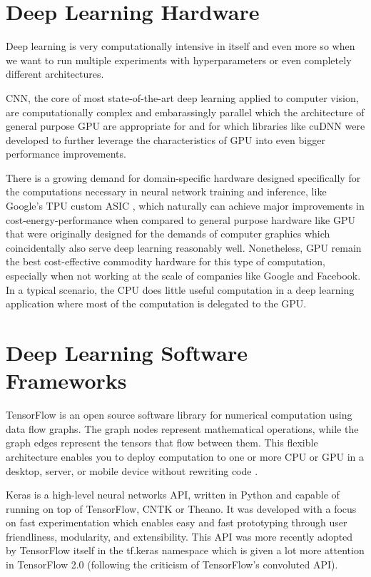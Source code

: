 \section{Deep Learning Hardware}

Deep learning is very computationally intensive in itself and even more so when we want to run multiple experiments with hyperparameters or even completely different architectures.

\ac{CNN}, the core of most state-of-the-art deep learning applied to computer vision, are computationally complex and embarassingly parallel \cite{chang2017} which the architecture of general purpose \ac{GPU} are appropriate for \cite{gpu} and for which libraries like cuDNN \cite{cudnn} were developed to further leverage the characteristics of \ac{GPU} into even bigger performance improvements.

There is a growing demand for domain-specific hardware designed specifically for the computations necessary in neural network training and inference, like Google's TPU custom ASIC \cite{tpu}, which naturally can achieve major improvements in cost-energy-performance when compared to general purpose hardware like \ac{GPU} that were originally designed for the demands of computer graphics which coincidentally also serve deep learning reasonably well. Nonetheless, \ac{GPU} remain the best cost-effective commodity hardware for this type of computation, especially when not working at the scale of companies like Google and Facebook. In a typical scenario, the CPU does little useful computation in a deep learning application where most of the computation is delegated to the GPU.


\section{Deep Learning Software Frameworks}

TensorFlow is an open source software library for numerical computation using data flow graphs. The graph nodes represent mathematical operations, while the graph edges represent the tensors that flow between them. This flexible architecture enables you to deploy computation to one or more CPU or GPU in a desktop, server, or mobile device without rewriting code \cite{tensorflow}.

Keras is a high-level neural networks API, written in Python and capable of running on top of TensorFlow, CNTK or Theano. It was developed with a focus on fast experimentation which enables easy and fast prototyping through user friendliness, modularity, and extensibility. This API was more recently adopted by TensorFlow itself in the tf.keras namespace which is given a lot more attention in TensorFlow 2.0 (following the criticism of TensorFlow's convoluted API).

